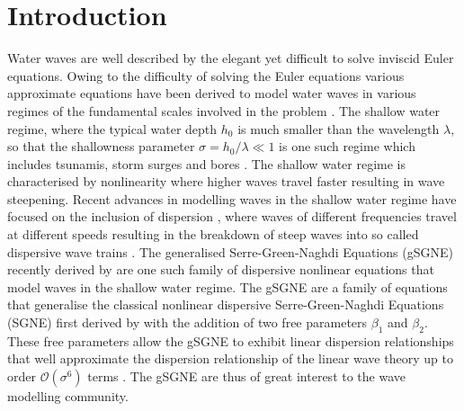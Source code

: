 \documentclass[10pt]{elsarticle}
\begin{document}
\section{Introduction}
Water waves are well described by the elegant yet difficult to solve inviscid Euler equations. Owing to the difficulty of solving the Euler equations various approximate equations have been derived to model water waves in various regimes of the fundamental scales involved in the problem \cite{Mehaute-1976}. The shallow water regime, where the typical water depth $h_0$ is much smaller than the wavelength $\lambda$, so that the shallowness parameter $\sigma = h_0/\lambda \ll 1$ is one such regime which includes tsunamis, storm surges and bores \cite{Sorenson-2006}. The shallow water regime is characterised by nonlinearity where higher waves travel faster resulting in wave steepening. Recent advances in modelling waves in the shallow water regime have focused on the inclusion of dispersion \cite{Kirby-etal-2013-39}, where waves of different frequencies travel at different speeds resulting in the breakdown of steep waves into so called dispersive wave trains \cite{El-etal-2006}. The generalised Serre-Green-Naghdi Equations (gSGNE) recently derived by \citet{Clamond-Dutykh-2018-237} are one such family of dispersive nonlinear equations that model waves in the shallow water regime. The gSGNE are a family of equations that generalise the classical nonlinear dispersive Serre-Green-Naghdi Equations (SGNE) first derived by \citet{Serre-F-1953-857} with the addition of two free parameters $\beta_1$ and $\beta_2$. These free parameters allow the gSGNE to exhibit linear dispersion relationships that well approximate the dispersion relationship of the linear wave theory \cite{Whitham-1967-399} up to order $\mathcal{O}\left(\sigma^6\right)$ terms \cite{Clamond-Dutykh-2018-237,Clamond-et.al-2017-245}. The gSGNE are thus of great interest to the wave modelling community. 
\end{document}
